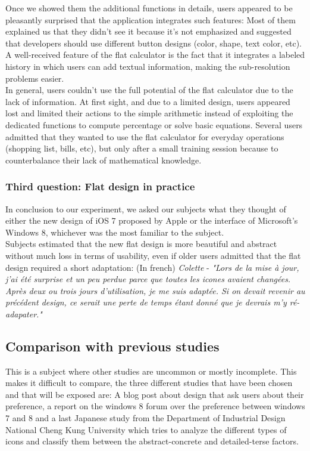 \documentclass[a4paper,11pt] {article}
\theoremstyle{definition}
\begin{document}
    Once we showed them the additional functions in details, users appeared to be pleasantly surprised that the application integrates such features: Most of them explained us that they didn't see it because it's not emphasized and suggested that developers should use different button designs (color, shape, text color, etc). A well-received feature of the flat calculator is the fact that it integrates a labeled history in which users can add textual information, making the sub-resolution problems easier.\\

    In general, users couldn't use the full potential of the flat calculator due to the lack of information. At first sight, and due to a limited design, users appeared lost and limited their actions to the simple arithmetic instead of exploiting the dedicated functions to compute percentage or solve basic equations. Several users admitted that they wanted to use the flat calculator for everyday operations (shopping list, bills, etc), but only after a small training session because to counterbalance their lack of mathematical knowledge.\\

    \subsubsection{Third question: Flat design in practice}
    In conclusion to our experiment, we asked our subjects what they thought of either the new design of iOS 7 proposed by Apple or the interface of Microsoft's Windows 8, whichever was the most familiar to the subject.\\

    Subjects estimated that the new flat design is more beautiful and abstract without much loss in terms of usability, even if older users admitted that the flat design required a short adaptation:
  	(In french) \textit{Colette} - \textit{"Lors de la mise à jour, j'ai été surprise et un peu perdue parce que toutes les icones avaient changées. Après deux ou trois jours d'utilisation, je me suis adaptée. Si on devait revenir au précédent design, ce serait une perte de temps étant donné que je devrais m'y ré-adapater."}

    \subsection{Comparison with previous studies}
    This is a subject where other studies are uncommon or mostly incomplete. This makes it difficult to compare, the three different studies that have been chosen and that will be exposed are: A blog post about design that ask users about their preference,  a report on the windows 8 forum over the preference between windows 7 and 8 and a last Japanese study from the Department of Industrial Design National Cheng Kung University which tries to analyze the different types of icons and classify them  between the abstract-concrete and detailed-terse factors.
\end{document}
